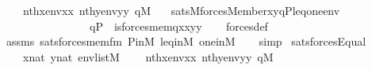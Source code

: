 \begin{isabellebody}
\ \ \ \ {\isachardoublequoteopen}nth{\isacharparenleft}{\kern0pt}x{\isacharcomma}{\kern0pt}env{\isacharparenright}{\kern0pt}{\isacharequal}{\kern0pt}xx{\isachardoublequoteclose}\ {\isachardoublequoteopen}nth{\isacharparenleft}{\kern0pt}y{\isacharcomma}{\kern0pt}env{\isacharparenright}{\kern0pt}{\isacharequal}{\kern0pt}yy{\isachardoublequoteclose}\ {\isachardoublequoteopen}q{\isasymin}M{\isachardoublequoteclose}\isanewline
\ \ \ {\isachardoublequoteopen}sats{\isacharparenleft}{\kern0pt}M{\isacharcomma}{\kern0pt}forces{\isacharparenleft}{\kern0pt}Member{\isacharparenleft}{\kern0pt}x{\isacharcomma}{\kern0pt}y{\isacharparenright}{\kern0pt}{\isacharparenright}{\kern0pt}{\isacharcomma}{\kern0pt}{\isacharbrackleft}{\kern0pt}q{\isacharcomma}{\kern0pt}P{\isacharcomma}{\kern0pt}leq{\isacharcomma}{\kern0pt}one{\isacharbrackright}{\kern0pt}{\isacharat}{\kern0pt}env{\isacharparenright}{\kern0pt}\ {\isasymlongleftrightarrow}\isanewline
\ \ \ \ \ \ \ \ \ \ \ \ \ \ \ \ {\isacharparenleft}{\kern0pt}q{\isasymin}P\ {\isasymand}\ is{\isacharunderscore}{\kern0pt}forces{\isacharunderscore}{\kern0pt}mem{\isacharparenleft}{\kern0pt}q{\isacharcomma}{\kern0pt}xx{\isacharcomma}{\kern0pt}yy{\isacharparenright}{\kern0pt}{\isacharparenright}{\kern0pt}{\isachardoublequoteclose}\isanewline
%
\isadelimproof
\ \ %
\endisadelimproof
%
\isatagproof
{}\isamarkupfalse%
\ forces{\isacharunderscore}{\kern0pt}def\isanewline
\ \ \isamarkupfalse%
\ assms\ sats{\isacharunderscore}{\kern0pt}forces{\isacharunderscore}{\kern0pt}mem{\isacharunderscore}{\kern0pt}fm\ P{\isacharunderscore}{\kern0pt}in{\isacharunderscore}{\kern0pt}M\ leq{\isacharunderscore}{\kern0pt}in{\isacharunderscore}{\kern0pt}M\ one{\isacharunderscore}{\kern0pt}in{\isacharunderscore}{\kern0pt}M\isanewline
\ \ \isamarkupfalse%
\ simp%
\endisatagproof
{\isafoldproof}%
%
\isadelimproof
\isanewline
%
\endisadelimproof
\isanewline
{}\isamarkupfalse%
\ sats{\isacharunderscore}{\kern0pt}forces{\isacharunderscore}{\kern0pt}Equal\ {\isacharcolon}{\kern0pt}\isanewline
\ \ \ \ {\isachardoublequoteopen}x{\isasymin}nat{\isachardoublequoteclose}\ {\isachardoublequoteopen}y{\isasymin}nat{\isachardoublequoteclose}\ {\isachardoublequoteopen}env{\isasymin}list{\isacharparenleft}{\kern0pt}M{\isacharparenright}{\kern0pt}{\isachardoublequoteclose}\isanewline
\ \ \ \ {\isachardoublequoteopen}nth{\isacharparenleft}{\kern0pt}x{\isacharcomma}{\kern0pt}env{\isacharparenright}{\kern0pt}{\isacharequal}{\kern0pt}xx{\isachardoublequoteclose}\ {\isachardoublequoteopen}nth{\isacharparenleft}{\kern0pt}y{\isacharcomma}{\kern0pt}env{\isacharparenright}{\kern0pt}{\isacharequal}{\kern0pt}yy{\isachardoublequoteclose}\ {\isachardoublequoteopen}q{\isasymin}M{\isachardoublequoteclose}\isanewline

\end{isabellebody}

